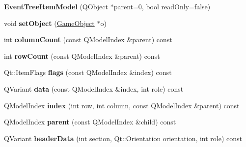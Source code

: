 \begin{DoxyCompactItemize}
\item 
\hypertarget{class_event_tree_item_model_ae7dfe9f1d73bdfc81a855337f3bd4884}{{\bfseries \-Event\-Tree\-Item\-Model} (\-Q\-Object $\ast$parent=0, bool read\-Only=false)}\label{class_event_tree_item_model_ae7dfe9f1d73bdfc81a855337f3bd4884}

\item 
\hypertarget{class_event_tree_item_model_abf351e783ebf95d604de8d6182cf9147}{void {\bfseries set\-Object} (\hyperlink{class_game_object}{\-Game\-Object} $\ast$o)}\label{class_event_tree_item_model_abf351e783ebf95d604de8d6182cf9147}

\item 
\hypertarget{class_event_tree_item_model_a549d9548b517fbc6b535c3bddf03a1e2}{int {\bfseries column\-Count} (const \-Q\-Model\-Index \&parent) const }\label{class_event_tree_item_model_a549d9548b517fbc6b535c3bddf03a1e2}

\item 
\hypertarget{class_event_tree_item_model_a1d55fb09ea570dd8a6251e13818d68d6}{int {\bfseries row\-Count} (const \-Q\-Model\-Index \&parent) const }\label{class_event_tree_item_model_a1d55fb09ea570dd8a6251e13818d68d6}

\item 
\hypertarget{class_event_tree_item_model_aa905772ebccf62b8a28c7bc0ced9806c}{\-Qt\-::\-Item\-Flags {\bfseries flags} (const \-Q\-Model\-Index \&index) const }\label{class_event_tree_item_model_aa905772ebccf62b8a28c7bc0ced9806c}

\item 
\hypertarget{class_event_tree_item_model_a53b0bc2adc2dda81c5f16886562bf718}{\-Q\-Variant {\bfseries data} (const \-Q\-Model\-Index \&index, int role) const }\label{class_event_tree_item_model_a53b0bc2adc2dda81c5f16886562bf718}

\item 
\hypertarget{class_event_tree_item_model_a016c7a2f68bb34b4cbd73e13bc39a065}{\-Q\-Model\-Index {\bfseries index} (int row, int column, const \-Q\-Model\-Index \&parent) const }\label{class_event_tree_item_model_a016c7a2f68bb34b4cbd73e13bc39a065}

\item 
\hypertarget{class_event_tree_item_model_a877b3bdbaf5e32cf91655c4d0233ff37}{\-Q\-Model\-Index {\bfseries parent} (const \-Q\-Model\-Index \&child) const }\label{class_event_tree_item_model_a877b3bdbaf5e32cf91655c4d0233ff37}

\item 
\hypertarget{class_event_tree_item_model_a13051fca366741133e34d7b913393861}{\-Q\-Variant {\bfseries header\-Data} (int section, \-Qt\-::\-Orientation orientation, int role) const }\label{class_event_tree_item_model_a13051fca366741133e34d7b913393861}


\end{DoxyCompactItemize}
